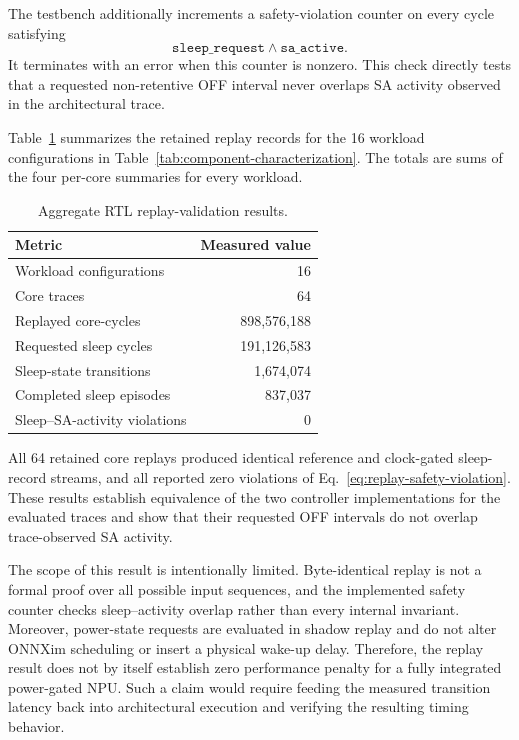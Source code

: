 The testbench additionally increments a safety-violation counter on every
cycle satisfying
\begin{equation}
  \texttt{sleep\_request} \land \texttt{sa\_active}.
  \label{eq:replay-safety-violation}
\end{equation}
It terminates with an error when this counter is nonzero.  This check directly
tests that a requested non-retentive OFF interval never overlaps SA activity
observed in the architectural trace.

Table~\ref{tab:rtl-replay-validation} summarizes the retained replay records
for the 16 workload configurations in Table~\ref{tab:component-characterization}.
The totals are sums of the four per-core summaries for every workload.

\begin{table}[t]
  \centering
  \caption{Aggregate RTL replay-validation results.}
  \label{tab:rtl-replay-validation}
  \begin{tabular}{lr}
    \toprule
    Metric & Measured value \\
    \midrule
    Workload configurations & 16 \\
    Core traces & 64 \\
    Replayed core-cycles & 898,576,188 \\
    Requested sleep cycles & 191,126,583 \\
    Sleep-state transitions & 1,674,074 \\
    Completed sleep episodes & 837,037 \\
    Sleep--SA-activity violations & 0 \\
    \bottomrule
  \end{tabular}
\end{table}

All 64 retained core replays produced identical reference and clock-gated
sleep-record streams, and all reported zero violations of
Eq.~\eqref{eq:replay-safety-violation}.  These results establish equivalence
of the two controller implementations for the evaluated traces and show that
their requested OFF intervals do not overlap trace-observed SA activity.

The scope of this result is intentionally limited.  Byte-identical replay is
not a formal proof over all possible input sequences, and the implemented
safety counter checks sleep--activity overlap rather than every internal
invariant.  Moreover, power-state requests are evaluated in shadow replay and
do not alter ONNXim scheduling or insert a physical wake-up delay.  Therefore,
the replay result does not by itself establish zero performance penalty for a
fully integrated power-gated NPU.  Such a claim would require feeding the
measured transition latency back into architectural execution and verifying
the resulting timing behavior.
